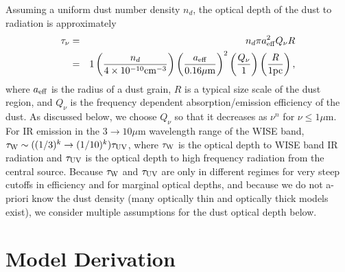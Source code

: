 Assuming a uniform dust number density $n_d$, the optical depth of the dust to
radiation is approximately
\begin{eqnarray}
\tau_{\nu} &=& n_d \pi a^2_{\rm{eff}} Q_{\nu} R \nonumber \\
& =& 1 \left( \frac{n_d}{4 \times 10^{-10} \rm{cm}^{-3}} \right) \left( \frac{a_{\rm{eff}}}{0.16 \mu \rm{m}} \right)^2  \left( \frac{Q_{\nu}}{1} \right)  \left( \frac{R}{1 \rm{pc}} \right),
\end{eqnarray} 
where $a_{\rm{eff}}$ is the radius of a dust grain, $R$ is a typical size
scale of the dust region, and $Q_{\nu}$ is the frequency dependent
absorption/emission efficiency of the dust. As discussed below, we choose
$Q_{\nu}$ so that it decreases as $\nu^n$ for $\nu \leq 1 \mu$m. For IR
emission in the $3 \rightarrow 10 \mu$m wavelength range of the WISE band,
$\tau_{\rm{W}} \sim ((1/3)^k \rightarrow (1/10)^k) \tau_{\rm{UV}}$, where
$\tau_{\rm{W}}$ is the optical depth to WISE band IR radiation and
$\tau_{\rm{UV}}$ is the optical depth to high frequency radiation from the
central source. Because $\tau_{\rm{W}}$ and $\tau_{\rm{UV}}$ are only in
different regimes for very steep cutoffs in efficiency and for marginal
optical depths, and because we do not a-priori know the dust density (many
optically thin and optically thick models exist), we consider multiple
assumptions for the dust optical depth below.





\section{Model Derivation}
\label{S:Derivation}
